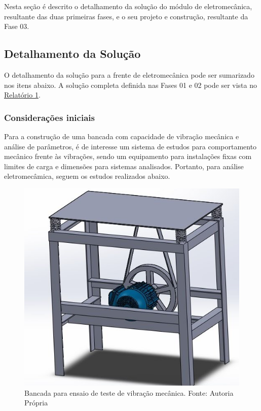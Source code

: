  \label{desenvolvimento_eletromecanica}
Nesta seção é descrito o detalhamento da solução do módulo de eletromecânica, resultante das duas primeiras fases,
e o seu projeto e construção, resultante da Fase 03.

\subsection{Detalhamento da Solução}

O detalhamento da solução para a frente de eletromecânica pode ser sumarizado nos itens abaixo. A solução completa definida nas
  Fases 01 e 02 pode ser vista no \href{https://drive.google.com/file/d/0B5InkGKx6O-MR1B3eVYzZFpjQ3c/view?usp=sharing}{Relatório 1}.

\subsubsection*{Considerações iniciais}

Para a construção de uma bancada com capacidade de vibração mecânica e análise de parâmetros, é de interesse um sistema de estudos para comportamento mecânico frente às vibrações, sendo um equipamento para instalações fixas com limites de carga e dimensões para sistemas analisados. Portanto, para análise eletromecâmica, seguem os estudos realizados abaixo.

\begin{figure}[h!]
	\centering
		\includegraphics[keepaspectratio=true,scale=0.6]{figuras/1.png}
	\caption{Bancada para ensaio de teste de vibração mecânica. Fonte: Autoria Própria}
    \label{bancada}
\end{figure}

